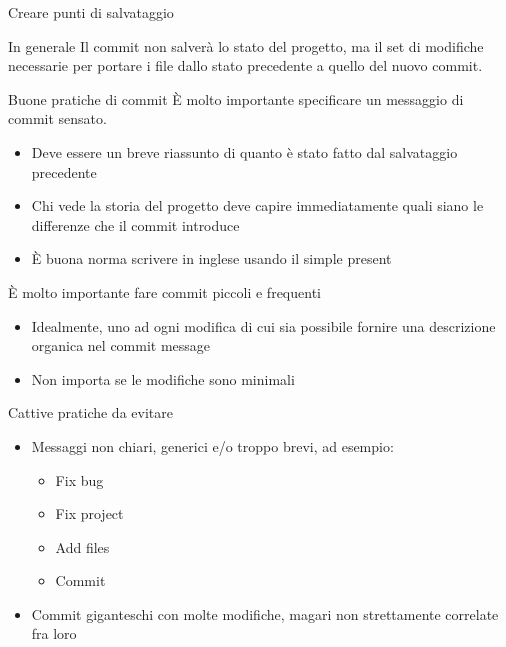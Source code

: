 \documentclass[presentation]{beamer}
\begin{document}
\begin{frame}{Creare punti di salvataggio}
\begin{block}{In generale}
		Il commit non salverà lo stato del progetto, ma il set di modifiche necessarie per portare i file dallo stato precedente a quello del nuovo commit.
	\end{block}
	\begin{block}{Buone pratiche di commit}
		È molto importante specificare un messaggio di commit sensato.
		\begin{itemize}
			\item Deve essere un breve riassunto di quanto è stato fatto dal salvataggio precedente
			\item Chi vede la storia del progetto deve capire immediatamente quali siano le differenze che il commit introduce
			\item È buona norma scrivere in inglese usando il simple present
		\end{itemize}
		È molto importante fare commit piccoli e frequenti
		\begin{itemize}
			\item Idealmente, uno ad ogni modifica di cui sia possibile fornire una descrizione organica nel commit message
			\item Non importa se le modifiche sono minimali
		\end{itemize}
	\end{block}
	\begin{block}{Cattive pratiche da evitare}
		\begin{itemize}
			\item Messaggi non chiari, generici e/o troppo brevi, ad esempio:
			\begin{itemize}
				\item Fix bug
				\item Fix project
				\item Add files
				\item Commit
			\end{itemize}
			\item Commit giganteschi con molte modifiche, magari non strettamente correlate fra loro

\end{itemize}
\end{block}
\end{frame}
\end{document}

